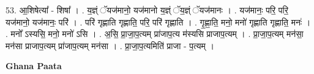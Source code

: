 \documentclass[17pt]{extarticle}
\begin{document}
53. आ॒शिषेत्या᳚ - शिषा᳚ । . य॒ज्ञ्ं ॅयज॑मानो॒ यज॑मानो य॒ज्ञ्ं ॅय॒ज्ञ्ं ॅयज॑मानः । . यज॑मानः॒ परि॒ परि॒ यज॑मानो॒ यज॑मानः॒ परि॑ । . परि॑ गृह्णाति गृह्णाति॒ परि॒ परि॑ गृह्णाति । . गृ॒ह्णा॒ति॒ मनो॒ मनो॑ गृह्णाति गृह्णाति॒ मनः॑ । . मनो᳚ ऽस्यसि॒ मनो॒ मनो॑ ऽसि । . अ॒सि॒ प्रा॒जा॒प॒त्यम् प्रा॑जाप॒त्य म॑स्यसि प्राजाप॒त्यम् । . प्रा॒जा॒प॒त्यम् मन॑सा॒ मन॑सा प्राजाप॒त्यम् प्रा॑जाप॒त्यम् मन॑सा । . प्रा॒जा॒प॒त्यमिति॑ प्राजा - प॒त्यम् । \newline

\textbf{Ghana Paata } \newline
\end{document}
